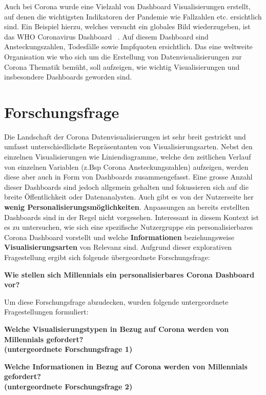 \documentclass[12pt, oneside]{article}
\begin{document}
Auch bei Corona wurde eine Vielzahl von Dashboard Visualisierungen erstellt, auf denen die wichtigsten Indikatoren der Pandemie wie Fallzahlen etc. ersichtlich sind. Ein Beispiel hierzu, welches versucht ein globales Bild wiederzugeben, ist das WHO Coronavirus Dashboard ~\citep{WHO.23.04.2022}. Auf diesem Dashboard sind Ansteckungszahlen, Todesfälle sowie Impfquoten ersichtlich. Das eine weltweite Organisation wie \Gls{who} sich um die Erstellung von Datenvisualisierungen zur Corona Thematik bemüht, soll aufzeigen, wie wichtig Visualisierungen und insbesondere Dashboards geworden sind.
\clearpage

\section{Forschungsfrage}
Die Landschaft der Corona Datenvisualisierungen ist sehr breit gestrickt und umfasst unterschiedlichste Repräsentanten von Visualisierungsarten. Nebst den einzelnen Visualisierungen wie Liniendiagramme, welche den zeitlichen Verlauf von einzelnen Variablen (z.Bsp Corona Ansteckungszahlen) aufzeigen, werden diese aber auch in Form von Dashboards zusammengefasst. Eine grosse Anzahl dieser Dashboards sind jedoch  allgemein gehalten und fokussieren sich auf die breite Öffentlichkeit oder Datenanalysten. Auch gibt es von der Nutzerseite her \textbf{wenig Personalisierungsmöglichkeiten}. Anpassungen an bereits erstellten Dashboards sind in der Regel nicht vorgesehen. Interessant in diesem Kontext ist es zu untersuchen, wie sich eine spezifische Nutzergruppe ein personalisierbares Corona Dashboard vorstellt und welche \textbf{Informationen} beziehungsweise \textbf{Visualisierungsarten} von Relevanz sind. Aufgrund dieser explorativen Fragestellung ergibt sich folgende übergeordnete Forschungsfrage:


\begin{center}
\textbf{Wie stellen sich Millennials ein personalisierbares Corona Dashboard vor?}
\end{center}

Um diese Forschungsfrage abzudecken, wurden folgende untergeordnete Fragestellungen formuliert:

\begin{center}
\textbf{Welche Visualisierungstypen in Bezug auf Corona werden von Millennials gefordert?\\
(untergeordnete Forschungsfrage 1)}
\end{center}

\begin{center}
\textbf{Welche Informationen in Bezug auf Corona werden von Millennials gefordert?\\
(untergeordnete Forschungsfrage 2)}
\end{center}
\end{document}
